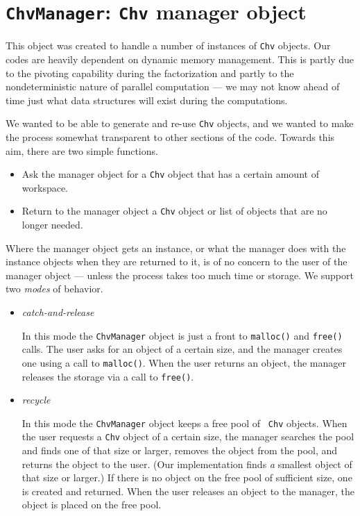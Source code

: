 \par
\chapter{{\tt ChvManager}: {\tt Chv} manager object }
\par
This object was created to handle 
a number of instances of {\tt Chv} objects.
Our codes are heavily dependent on dynamic memory management.
This is partly due to the pivoting capability during the
factorization and partly to the nondeterministic nature of
parallel computation --- we may not know ahead of time just what
data structures will exist during the computations.
\par
We wanted to be able to generate and re-use {\tt Chv} objects,
and we wanted to make the process somewhat transparent to other
sections of the code.
Towards this aim, there are two simple functions.
\begin{itemize}
\item
Ask the manager object for a {\tt Chv} object that has a certain
amount of workspace.
\item
Return to the manager object a {\tt Chv} object or list of objects
that are no longer needed.
\end{itemize}
Where the manager object gets an instance, 
or what the manager does with the
instance objects when they are returned to it,
is of no concern to the user of the manager object ---
unless the process takes too much time or storage.
We support two {\it modes} of behavior.
\begin{itemize}
\item {\it catch-and-release}
\par
In this mode the {\tt ChvManager} object is just a front to
{\tt malloc()} and {\tt free()} calls.
The user asks for an object of a certain size, and the manager
creates one using a call to {\tt malloc()}.
When the user returns an object, the manager releases the storage
via a call to {\tt free()}.
\item {\it recycle}
\par
In this mode the {\tt ChvManager} object keeps a free pool of {\tt
Chv} objects. When the user requests a {\tt Chv} object of a
certain size, the manager searches the pool and finds one of that
size or larger, removes the object from the pool,
and returns the object to the user. 
(Our implementation finds {\it a} smallest object
of that size or larger.)
If there is no object on the free pool of sufficient size,
one is created and returned.
When the user releases an object to the manager, the object is
placed on the free pool.
\end{itemize}
